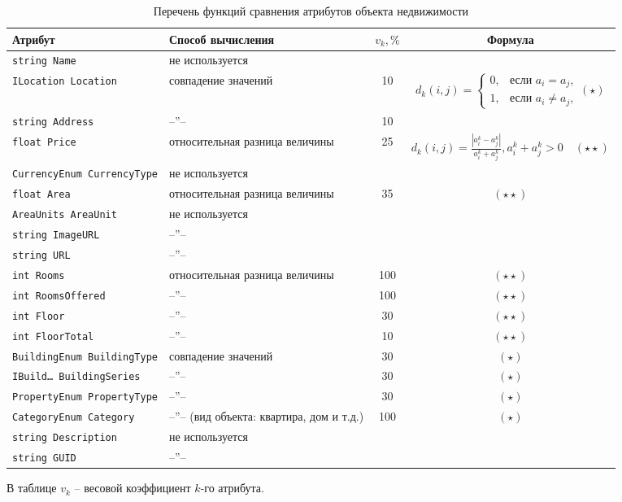 \documentclass[a4paper,14pt,openany,final]{extreport} %
\def\oldcaption{} \let\oldcaption=\caption
\def\caption{\stepcounter{captionsnum}\oldcaption}
\begin{document}
\begin{table}[htbp]\footnotesize
  \caption{Перечень функций сравнения атрибутов объекта недвижимости}
  \label{tab:attrdiff}
  \centering
  \begin{tabular}{|l|p{5cm}|c|c|}
    \hline
    Атрибут & Способ вычисления & $v_k, \%$ & Формула \\
    \hline
\texttt{string Name} & не используется & & \\
    \texttt{ILocation Location} & совпадение значений & 10 & $d_k(i,j) = \left\{
                                                          \begin{array}{ll}
                                                            0, & \mbox{если\ \ } a_i=a_j,\\
                                                            1, & \mbox{если\ \ } a_i\neq a_j,
                                                          \end{array}
                                                          \right. (\star)$
    \\
\texttt{string Address} & --''-- & 10 & \\
\texttt{float Price} & относительная разница величины & 25 & $d_k(i,j) = \frac{|a_i^k-a_j^k|}{a_i^k+a_j^k}, a_i^k+a_j^k>0\quad(\star\star)$\\
\texttt{CurrencyEnum CurrencyType} & не используется  & & \\
\texttt{float Area} & относительная разница величины  & 35 & $(\star\star)$\\
\texttt{AreaUnits AreaUnit} & не используется & &\\
\texttt{string ImageURL} & --''-- & & \\
\texttt{string URL} & --''-- & & \\
\texttt{int Rooms}  & относительная разница величины  & 100 & $(\star\star)$\\
\texttt{int RoomsOffered} &  --''--   & 100 & $(\star\star)$\\
\texttt{int Floor}  &  --''--   & 30 & $(\star\star)$\\
\texttt{int FloorTotal}  &  --''--   & 10 & $(\star\star)$\\
\texttt{BuildingEnum BuildingType}  & совпадение значений & 30 & $(\star)$\\
\texttt{IBuild\ldots{} BuildingSeries}  & --''-- & 30 &  $(\star)$\\
\texttt{PropertyEnum PropertyType} & --''-- & 30 &  $(\star)$\\
\texttt{CategoryEnum Category} & --''-- (вид объекта: квартира, дом и т.д.) & 100 &  $(\star)$\\
\texttt{string Description} & не используется & & \\
    \texttt{string GUID} & --''-- & & \\
    \hline
  \end{tabular}
  В таблице $v_k$ -- весовой коэффициент $k$-го атрибута.
\end{table}
\end{document}
